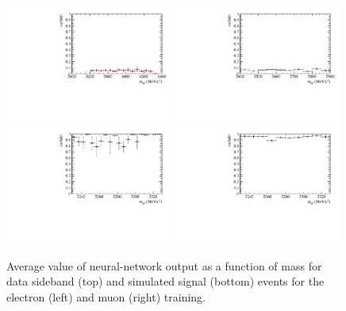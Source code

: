 
\begin{figure}[h!]
\centering
\includegraphics[width=0.49\textwidth]{RKst/figs/Training/EE_wNB_vs_MPV_bkg.pdf}
\includegraphics[width=0.49\textwidth]{RKst/figs/Training/MM_wNB_vs_MPV_bkg.pdf}
\includegraphics[width=0.49\textwidth]{RKst/figs/Training/EE_wNB_vs_MPV_sgn.pdf}
\includegraphics[width=0.49\textwidth]{RKst/figs/Training/MM_wNB_vs_MPV_sgn.pdf}
\caption{Average value of neural-network output as a function of \Bz mass for data
sideband (top) and simulated signal (bottom) events for the electron (left) and muon (right) training.}
\label{fig:RKst_NNprofiles}
\end{figure}
